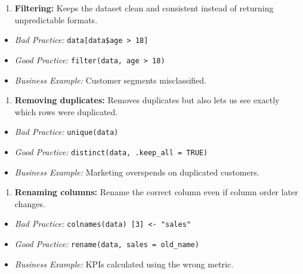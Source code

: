 \documentclass[
  stu,
  floatsintext,
  longtable,
  a4paper,
  nolmodern,
  notxfonts,
  notimes,
  colorlinks=true,linkcolor=blue,citecolor=blue,urlcolor=blue]{apa7}
\providecommand{\tightlist}{%
  \setlength{\itemsep}{0pt}\setlength{\parskip}{0pt}}
\begin{document}
\begin{enumerate}
\def\labelenumi{\arabic{enumi}.}
\setcounter{enumi}{5}
\tightlist
\item
  \textbf{Filtering:} Keeps the dataset clean and consistent instead of
  returning unpredictable formats.
\end{enumerate}

\begin{itemize}
\tightlist
\item
  \emph{Bad Practice:} \texttt{data{[}data\$age\ \textgreater{}\ 18{]}}
\item
  \emph{Good Practice:} \texttt{filter(data,\ age\ \textgreater{}\ 18)}
\item
  \emph{Business Example:} Customer segments misclassified.
\end{itemize}

\begin{enumerate}
\def\labelenumi{\arabic{enumi}.}
\setcounter{enumi}{6}
\tightlist
\item
  \textbf{Removing duplicates:} Removes duplicates but also lets us see
  exactly which rows were duplicated.
\end{enumerate}

\begin{itemize}
\tightlist
\item
  \emph{Bad Practice:} \texttt{unique(data)}
\item
  \emph{Good Practice:} \texttt{distinct(data,\ .keep\_all\ =\ TRUE)}
\item
  \emph{Business Example:} Marketing overspends on duplicated customers.
\end{itemize}

\begin{enumerate}
\def\labelenumi{\arabic{enumi}.}
\setcounter{enumi}{7}
\tightlist
\item
  \textbf{Renaming columns:} Rename the correct column even if column
  order later changes.
\end{enumerate}

\begin{itemize}
\tightlist
\item
  \emph{Bad Practice:}
  \texttt{colnames(data)\ {[}3{]}\ \textless{}-\ "sales"}
\item
  \emph{Good Practice:} \texttt{rename(data,\ sales\ =\ old\_name)}
\item
  \emph{Business Example:} KPIs calculated using the wrong metric.
\end{itemize}
\end{document}
